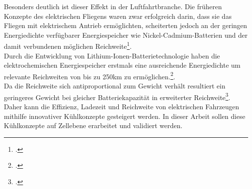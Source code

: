 Besonders deutlich ist dieser Effekt in der Luftfahrtbranche. Die früheren Konzepte des elektrischen Fliegens waren zwar erfolgreich darin, dass sie das Fliegen mit elektrischem Antrieb ermöglichten, scheiterten jedoch an der geringen Energiedichte verfügbarer Energiespeicher wie Nickel-Cadmium-Batterien und der damit verbundenen möglichen Reichweite\footcite[Vgl.][S. 4]{Hepperle2012}.\\
Durch die Entwicklung von Lithium-Ionen-Batterietechnologie haben die elektrochemischen Energiespeicher erstmals eine ausreichende Energiedichte um relevante Reichweiten von bis zu 250km zu ermöglichen.\footcite[Vgl.][]{Lilium}.\\
Da die Reichweite sich antiproportional zum Gewicht verhält resultiert ein geringeres Gewicht bei gleicher Batteriekapazität in erweiterter Reichweite\footcite[Vgl.][S. 705]{Traub2011}.\\
Daher kann die Effizienz, Ladezeit und Reichweite von elektrischen Fahrzeugen mithilfe innovativer Kühlkonzepte gesteigert werden. In dieser Arbeit sollen diese Kühlkonzepte auf Zellebene erarbeitet und validiert werden.\\

















